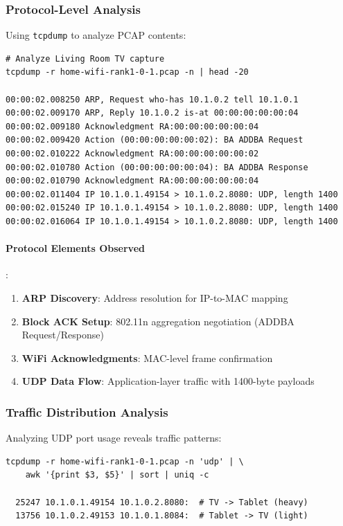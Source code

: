 \subsubsection{Protocol-Level Analysis}

Using \texttt{tcpdump} to analyze PCAP contents:

\begin{lstlisting}[style=bash, caption={PCAP traffic analysis}]
# Analyze Living Room TV capture
tcpdump -r home-wifi-rank1-0-1.pcap -n | head -20

00:00:02.008250 ARP, Request who-has 10.1.0.2 tell 10.1.0.1
00:00:02.009170 ARP, Reply 10.1.0.2 is-at 00:00:00:00:00:04
00:00:02.009180 Acknowledgment RA:00:00:00:00:00:04
00:00:02.009420 Action (00:00:00:00:00:02): BA ADDBA Request
00:00:02.010222 Acknowledgment RA:00:00:00:00:00:02
00:00:02.010780 Action (00:00:00:00:00:04): BA ADDBA Response
00:00:02.010790 Acknowledgment RA:00:00:00:00:00:04
00:00:02.011404 IP 10.1.0.1.49154 > 10.1.0.2.8080: UDP, length 1400
00:00:02.015240 IP 10.1.0.1.49154 > 10.1.0.2.8080: UDP, length 1400
00:00:02.016064 IP 10.1.0.1.49154 > 10.1.0.2.8080: UDP, length 1400
\end{lstlisting}

\paragraph{Protocol Elements Observed}:
\begin{enumerate}
    \item \textbf{ARP Discovery}: Address resolution for IP-to-MAC mapping
    \item \textbf{Block ACK Setup}: 802.11n aggregation negotiation (ADDBA Request/Response)
    \item \textbf{WiFi Acknowledgments}: MAC-level frame confirmation
    \item \textbf{UDP Data Flow}: Application-layer traffic with 1400-byte payloads
\end{enumerate}

\subsubsection{Traffic Distribution Analysis}

Analyzing UDP port usage reveals traffic patterns:

\begin{lstlisting}[style=bash, caption={UDP traffic breakdown}]
tcpdump -r home-wifi-rank1-0-1.pcap -n 'udp' | \
    awk '{print $3, $5}' | sort | uniq -c

  25247 10.1.0.1.49154 10.1.0.2.8080:  # TV -> Tablet (heavy)
  13756 10.1.0.2.49153 10.1.0.1.8084:  # Tablet -> TV (light)
\end{lstlisting}

